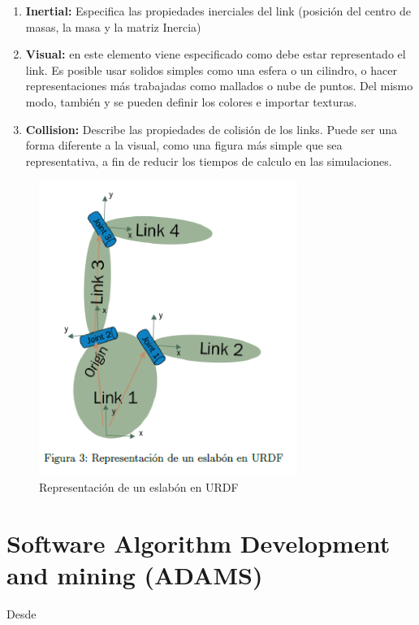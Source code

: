         \begin{enumerate}
            \item \textbf{Inertial:} Especifica las propiedades inerciales del link (posición del centro de masas, la masa y la matriz Inercia)
            \item \textbf{Visual:} en este elemento viene especificado como debe estar representado el link. Es posible usar solidos simples como una esfera o un cilindro, o hacer representaciones más trabajadas como mallados o nube de puntos. Del mismo modo, también y se pueden definir los colores e importar texturas.
            \item \textbf{Collision:} Describe las propiedades de colisión de los links. Puede ser una forma diferente a la visual, como una figura más simple que sea representativa, a fin de reducir los tiempos de calculo en las simulaciones.
        \end{enumerate}
        
        \begin{figure}[htb]
            \centering
            \includegraphics[width=1.0\linewidth]{Main/Chapter3/Images3/3-7/representacion-de-eslabon-en-urdf.png}
            \caption{Representación de un eslabón en URDF}
            \label{f:Cap3-7_eslabon_urdf}
        \end{figure} 
        
        
    
    
    \newpage

\section{Software Algorithm Development and mining (ADAMS)}
Desde

    
      
        
            
            
            

        
    
    